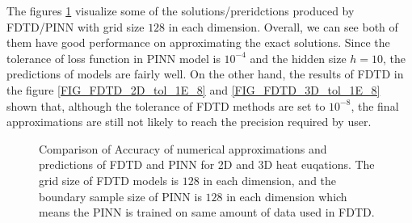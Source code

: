 The figures \ref{FIG_PINN_FDTD_TOL} visualize some of the solutions/preridctions produced by FDTD/PINN with 
grid size $128$ in each dimension.
Overall, we can see both of them have good performance on approximating the exact solutions.
Since the tolerance of loss function in PINN model is $10^{-4}$ and the 
hidden size $h=10$, 
the predictions of models are fairly well.
On the other hand, the results of FDTD in the figure \ref{FIG_FDTD_2D_tol_1E_8} and \ref{FIG_FDTD_3D_tol_1E_8} shown that, 
although the tolerance of FDTD methods 
are set to $10^{-8}$, the final approximations are still not likely to reach the precision required by user.
\begin{figure}[htbp]
  \centering
  \hspace{0em} 
  \hspace{0em} 
  \hspace{0em} 
  \caption{
    Comparison of Accuracy of numerical approximations and predictions of FDTD and PINN for 2D and 3D heat euqations.
    The grid size of FDTD models is $128$ in each dimension, and the boundary sample size of PINN is $128$ in each dimension
    which means the PINN is trained on same amount of data used in FDTD.
  }
  \label{FIG_PINN_FDTD_TOL}
\end{figure}


